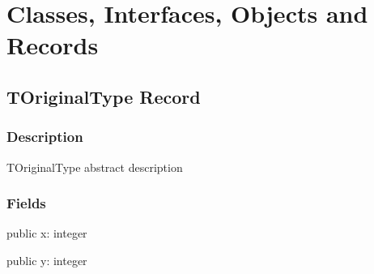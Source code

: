 \documentclass{report}
\newif\ifpdf
\begin{document}
\section{Classes, Interfaces, Objects and Records}
\ifpdf
\subsection*{\large{\textbf{TOriginalType Record}}\normalsize\hspace{1ex}\hrulefill}
\else
\subsection*{TOriginalType Record}
\fi
\label{ok_type_aliases.TOriginalType}
\subsubsection*{\large{\textbf{Description}}\normalsize\hspace{1ex}\hfill}
TOriginalType abstract description\subsubsection*{\large{\textbf{Fields}}\normalsize\hspace{1ex}\hfill}
\begin{list}{}{
\setlength{\itemindent}{0cm}
\setlength{\listparindent}{0cm}
\setlength{\leftmargin}{\evensidemargin}
\addtolength{\leftmargin}{\tmplength}
\settowidth{\labelsep}{X}
\addtolength{\leftmargin}{\labelsep}
\setlength{\labelwidth}{\tmplength}
}
\label{ok_type_aliases.TOriginalType-x}
\item[\textbf{x}\hfill]
\ifpdf
\begin{flushleft}
\fi
\begin{ttfamily}
public x: integer \end{ttfamily}

\ifpdf
\end{flushleft}
\fi


\par  \label{ok_type_aliases.TOriginalType-y}
\item[\textbf{y}\hfill]
\ifpdf
\begin{flushleft}
\fi
\begin{ttfamily}
public y: integer \end{ttfamily}

\ifpdf
\end{flushleft}
\fi


\par  \end{list}
\ifpdf
\end{document}
